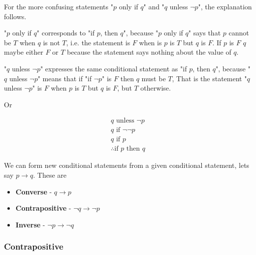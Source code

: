 \documentclass[12pt letter]{report}
\begin{document}
For the more confusing statements "$p$ only if $q$" and "$q$ unless $\neg p$", the explanation follows.

"$p$ only if $q$" corresponds to "if $p$, then $q$", because "$p$ only if $q$" says that $p$ cannot be $T$ when $q$ is not
$T$, i.e. the statement is $F$ when is $p$ is $T$ but $q$ is $F$. If $p$ is $F$ $q$ maybe either $F$ or $T$ because the
statement says nothing about the value of $q$.

"$q$ unless $\neg p$" expresses the same conditional statement as "if $p$, then $q$", because "$q$ unless $\neg p$"
means that if "if $\neg p$" is $F$ then $q$ must be $T$, That is the statement "$q$ unless $\neg p$" is $F$ when $p$ is
$T$ but $q$ is $F$, but $T$ otherwise.

Or

\begin{align*}
	q \text{ unless } \neg p  \\
	q \text{ if } \neg \neg p \\
	q \text{ if } p           \\
	\therefore \text{if } p \text{ then } q
\end{align*}


We can form new conditional statements from a given conditional statement, lets say $p \to q$. These are

\begin{itemize}
	\item \textbf{Converse} - $q \to  p$
	\item \textbf{Contrapositive} - $\neg q \to \neg p$
	\item \textbf{Inverse} - $\neg p \to \neg q$
\end{itemize}


\subsubsection{Contrapositive}
\end{document}
